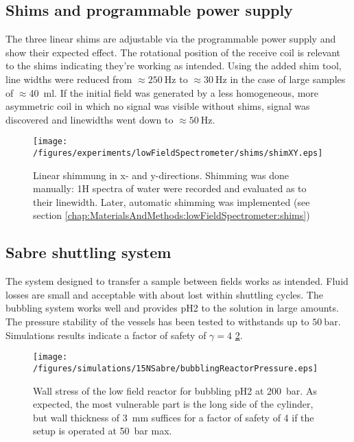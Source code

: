         \subsection{Shims and programmable power supply}
            The three linear shims are adjustable via the programmable power supply and show
            their expected effect. The rotational position of the receive coil is relevant to the
            shims indicating they're working as intended. Using the added shim tool, line widths
            were reduced from $\approx \SI{250}{\hertz}$ to $\approx \SI{30}{\hertz}$ in the case of large samples of $\approx
            $\SI{40}{\milli\litre}. If the initial field was generated by a less homogeneous, more
            asymmetric coil in which no signal was visible without shims, signal was discovered and linewidths went down to
            $\approx \SI{50}{\hertz}$.
            \begin{figure}[h]
                \label{fig:results:lowFieldSpectrometer:shims}
                \texttt{[image: /figures/experiments/lowFieldSpectrometer/shims/shimXY.eps]}
                \caption{Linear shimmung in x- and y-directions. Shimming was done manually: 1H spectra of water were recorded and evaluated as to their linewidth. Later, automatic shimming was implemented (see section \ref{chap:MaterialsAndMethods:lowFieldSpectrometer:shims})}
            \end{figure}
    \subsection{Sabre shuttling system}
        The system designed to transfer a sample between fields works as intended. Fluid losses are
        small and acceptable with about  lost within  shuttling cycles. The
        bubbling system works well and provides pH2 to the solution in large amounts. The pressure
        stability of the vessels has been tested to withstands up to $\SI{50}{\bar}$. Simulations results indicate a factor of safety of $\gamma = 4$ \ref{fig:results:bubblingReactorPressure}.
        \begin{figure}
            \label{fig:results:bubblingReactorPressure}
            \centering
            \texttt{[image: /figures/simulations/15NSabre/bubblingReactorPressure.eps]}
            \caption{Wall stress of the low field reactor for bubbling pH2 at \SI{200}{\bar}. As expected, the most vulnerable part is the long side of the cylinder, but wall thickness of \SI{3}{\milli\meter} suffices for a factor of safety of 4 if the setup is operated at \SI{50}{\bar} max.}
        \end{figure}
        

